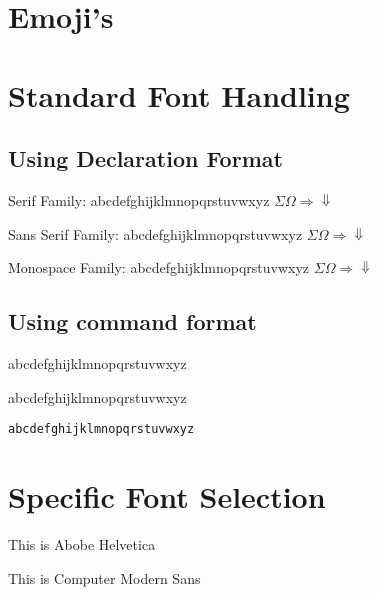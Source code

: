 \documentclass[11pt]{article}
\begin{document}
\section{Emoji's}


\section{Standard Font Handling}

\subsection{Using Declaration Format}

\rmfamily 
Serif Family:
abcdefghijklmnopqrstuvwxyz
$\Sigma \Omega \Longrightarrow \Downarrow$

\sffamily 
Sans Serif Family:
abcdefghijklmnopqrstuvwxyz
$\Sigma \Omega \Longrightarrow \Downarrow$

\ttfamily 
Monospace Family:
abcdefghijklmnopqrstuvwxyz
$\Sigma \Omega \Longrightarrow \Downarrow$

\subsection{Using command format}

\textsf{abcdefghijklmnopqrstuvwxyz}\par
\textrm{abcdefghijklmnopqrstuvwxyz}\par
\texttt{abcdefghijklmnopqrstuvwxyz}



\section{Specific Font Selection}

{
    This is Abobe Helvetica
}

{
    This is Computer Modern Sans
}
\end{document}
